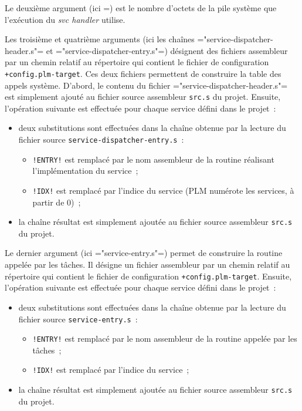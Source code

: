 Le deuxième argument (ici =) est le nombre d'octets de la pile système que l'exécution du \emph{svc handler} utilise.

Les troisième et quatrième arguments (ici les chaînes \plm="service-dispatcher-header.s"= et \plm="service-dispatcher-entry.s"=) désignent des fichiers assembleur par un chemin relatif au répertoire qui contient le fichier de configuration \texttt{+config.plm-target}. Ces deux fichiers permettent de construire la table des appels système. D'abord, le contenu du fichier \plm="service-dispatcher-header.s"= est simplement ajouté au fichier source assembleur \texttt{src.s} du projet. Ensuite, l'opération suivante est effectuée pour chaque service défini dans le projet~:
\begin{itemize}
  \item deux substitutions sont effectuées dans la chaîne obtenue par la lecture du fichier source \texttt{service-dispatcher-entry.s}~:
  \begin{itemize}
    \item \texttt{!ENTRY!} est remplacé par le nom assembleur de la routine réalisant l'implémentation du service~;
    \item \texttt{!IDX!} est remplacé par l'indice du service (PLM numérote les services, à partir de $0$)~;
  \end{itemize}
  \item la chaîne résultat est simplement ajoutée au fichier source assembleur \texttt{src.s} du projet.
\end{itemize}

Le dernier argument (ici \plm="service-entry.s"=) permet de construire la routine appelée par les tâches. Il désigne un fichier assembleur par un chemin relatif au répertoire qui contient le fichier de configuration \texttt{+config.plm-target}. Ensuite, l'opération suivante est effectuée pour chaque service défini dans le projet~:
\begin{itemize}
  \item deux substitutions sont effectuées dans la chaîne obtenue par la lecture du fichier source \texttt{service-entry.s}~:
  \begin{itemize}
    \item \texttt{!ENTRY!} est remplacé par le nom assembleur de la routine appelée par les tâches~;
    \item \texttt{!IDX!} est remplacé par l'indice du service~;
  \end{itemize}
  \item la chaîne résultat est simplement ajoutée au fichier source assembleur \texttt{src.s} du projet.
\end{itemize}











